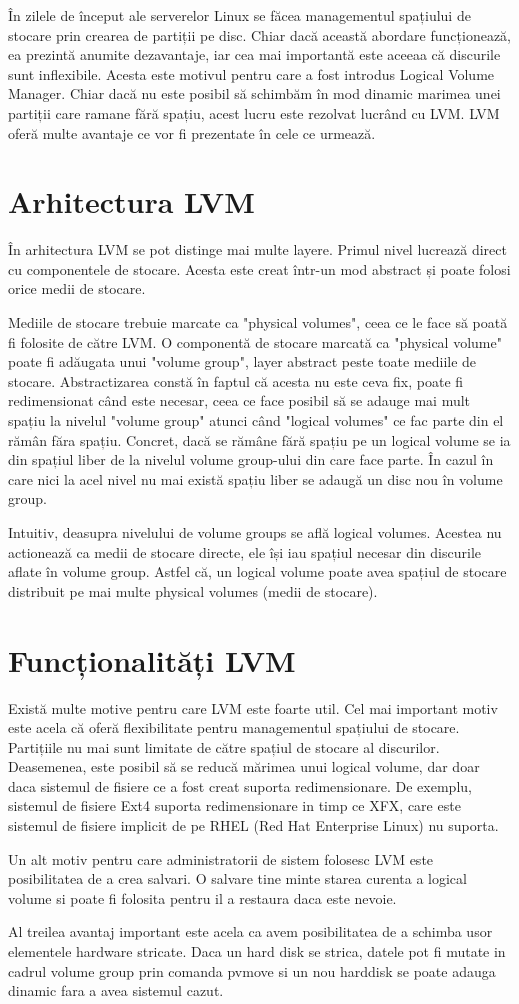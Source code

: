 În zilele de început ale serverelor Linux se făcea managementul spațiului de stocare prin crearea de partiții pe disc. Chiar dacă această abordare funcționează, ea prezintă anumite dezavantaje, iar cea mai importantă este aceeaa că discurile sunt inflexibile. Acesta este motivul pentru care a fost introdus Logical Volume Manager. Chiar dacă nu este posibil să schimbăm în mod dinamic marimea unei partiții care ramane fără spațiu, acest lucru este rezolvat lucrând cu LVM. LVM oferă multe avantaje ce vor fi prezentate în cele ce urmează.
\section{Arhitectura LVM}
În arhitectura LVM se pot distinge mai multe layere. Primul nivel lucrează direct cu componentele de stocare. Acesta este creat într-un mod abstract și poate folosi orice medii de stocare.
\par
Mediile de stocare trebuie marcate ca "physical volumes", ceea ce le face să poată fi folosite de către LVM. O componentă de stocare marcată ca "physical volume" poate fi adăugata unui "volume group", layer abstract peste toate mediile de stocare. Abstractizarea constă în faptul că acesta nu este ceva fix, poate fi redimensionat când este necesar, ceea ce face posibil să se adauge mai mult spațiu la nivelul "volume group" atunci când "logical volumes" ce fac parte din el rămân făra spațiu. Concret, dacă se rămâne fără spațiu pe un logical volume se ia din spațiul liber de la nivelul volume group-ului din care face parte. În cazul în care nici la acel nivel nu mai există spațiu liber se adaugă un disc nou în volume group. 
\par
Intuitiv, deasupra nivelului de volume groups se află logical volumes. Acestea nu actionează ca medii de stocare directe, ele își iau spațiul necesar din discurile aflate în volume group. Astfel că, un logical volume poate avea spațiul de stocare distribuit pe mai multe physical volumes (medii de stocare).
\section{Funcționalități LVM}
Există multe motive pentru care LVM este foarte util. Cel mai important motiv este acela că oferă flexibilitate pentru managementul spațiului de stocare. Partițiile nu mai sunt limitate de către spațiul de stocare al discurilor. Deasemenea, este posibil să se reducă mărimea unui logical volume, dar doar daca sistemul de fisiere ce a fost creat suporta redimensionare. De exemplu, sistemul de fisiere Ext4 suporta redimensionare in timp ce XFX, care este sistemul de fisiere implicit de pe RHEL (Red Hat Enterprise Linux) nu suporta.
\par
Un alt motiv pentru care administratorii de sistem folosesc LVM este posibilitatea de a crea salvari. O salvare tine minte starea curenta a logical volume si poate fi folosita pentru il a restaura daca este nevoie.
\par
Al treilea avantaj important este acela ca avem posibilitatea de a schimba usor elementele hardware stricate. Daca un hard disk se strica, datele pot fi mutate in cadrul volume group prin comanda pvmove si un nou harddisk se poate adauga dinamic fara a avea sistemul cazut.
